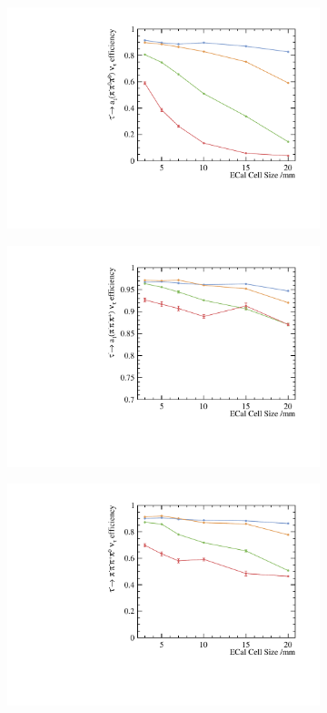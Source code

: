 \begin{figure}[htbp]
\begin{subfigure}[b]{0.45\textwidth}
  \includegraphics[width=\textwidth]{tau/plots3/decayMode4.pdf}
  \caption{}
  \label{fig:tauDecayMode4}
\end{subfigure}
\begin{subfigure}[b]{0.45\textwidth}
  \includegraphics[width=\textwidth]{tau/plots3/decayMode5.pdf}
  \caption{}
  \label{fig:tauDecayMode5}
\end{subfigure}
\begin{subfigure}[b]{0.45\textwidth}
  \includegraphics[width=\textwidth]{tau/plots3/decayMode6.pdf}

\end{subfigure}
\end{figure}

